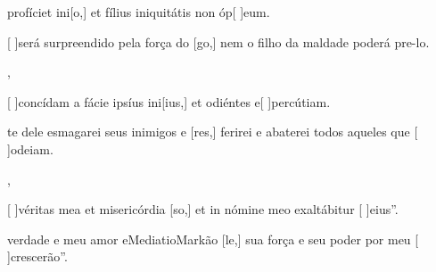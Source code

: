 {  {\item {} profíciet ini[o,] et fílius iniquitátis non óp[ ]{e}um.~\Antiphona}%
    {\item {}[ ]{se}rá surpreendido pela força do [go,] nem o filho da maldade poderá pre-lo.~\Antiphona},
  {\item {}[ ]{con}cídam a fácie ipsíus ini[ius,] et odiéntes e[ ]{per}{cú}tiam.~\Antiphona}%
    {\item {}te dele esmagarei seus inimigos e [res,] ferirei e abaterei todos aqueles que [ ]{o}{dei}am.~\Antiphona},
  {\item {}[ ]{vé}ritas mea et misericórdia [so,] et in nómine meo exaltábitur [ ]{e}ius”.~\Antiphona}%
    {\item {} verdade e meu amor eMediatioMarkão [le,] sua força e seu poder por meu [ ]{cres}cerão”.~\Antiphona}
}